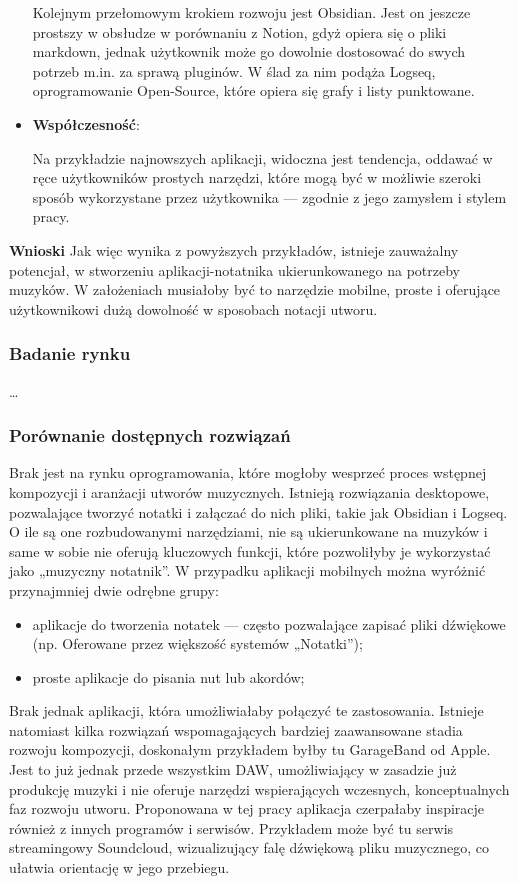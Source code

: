 \documentclass[12pt]{article}
\begin{document}
\begin{itemize}
	      Kolejnym przełomowym krokiem rozwoju jest Obsidian. Jest on jeszcze prostszy w obsłudze w porównaniu z Notion,
	      gdyż opiera się o pliki markdown, jednak użytkownik może go dowolnie dostosować do swych potrzeb m.in. za sprawą pluginów.
	      W ślad za nim podąża Logseq, oprogramowanie Open-Source, które opiera się grafy i listy punktowane.
	\item \textbf{Współczesność}:
	      
	      Na przykładzie najnowszych aplikacji, widoczna jest tendencja, oddawać w ręce użytkowników prostych narzędzi,
	      które mogą być w możliwie szeroki sposób wykorzystane przez użytkownika — zgodnie z jego zamysłem i stylem pracy.
\end{itemize}
\textbf{Wnioski}
Jak więc wynika z powyższych przykładów, istnieje zauważalny potencjał, w stworzeniu aplikacji-notatnika ukierunkowanego na potrzeby muzyków.
W założeniach musiałoby być to narzędzie mobilne, proste i oferujące użytkownikowi dużą dowolność w sposobach notacji utworu.

\subsubsection{Badanie rynku}
\ldots

\subsubsection{Porównanie dostępnych rozwiązań}
Brak jest na rynku oprogramowania, które mogłoby wesprzeć proces wstępnej kompozycji i aranżacji utworów muzycznych.
Istnieją rozwiązania desktopowe, pozwalające tworzyć notatki i załączać do nich pliki, takie jak Obsidian i Logseq.
O ile są one rozbudowanymi narzędziami, nie są ukierunkowane na muzyków i same w sobie nie oferują kluczowych funkcji,
które pozwoliłyby je wykorzystać jako „muzyczny notatnik”.
W przypadku aplikacji mobilnych można wyróżnić przynajmniej dwie odrębne grupy:
\begin{itemize}
	\item aplikacje do tworzenia notatek — często pozwalające zapisać pliki dźwiękowe (np. Oferowane przez większość systemów „Notatki”);
	\item proste aplikacje do pisania nut lub akordów;
\end{itemize}
Brak jednak aplikacji, która umożliwiałaby połączyć te zastosowania.
Istnieje natomiast kilka rozwiązań wspomagających bardziej zaawansowane stadia rozwoju kompozycji,
doskonałym przykładem byłby tu GarageBand od Apple.
Jest to już jednak przede wszystkim DAW, umożliwiający w zasadzie już produkcję muzyki i nie oferuje narzędzi wspierających wczesnych,
konceptualnych faz rozwoju utworu.
Proponowana w tej pracy aplikacja czerpałaby inspiracje również z innych programów i serwisów.
Przykładem może być tu serwis streamingowy Soundcloud, wizualizujący falę dźwiękową pliku muzycznego, co ułatwia orientację w jego przebiegu.
\end{document}
